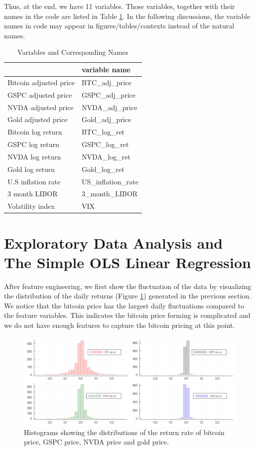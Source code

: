 \documentclass[9pt,twocolumn,twoside]{ilcss}
\begin{document}
Thus, at the end, we have 11 variables. Those variables, together with their names in the code are listed in Table \ref{var_names}. In the following discussions, the variable names in code may appear in figures/tables/contexts instead of the natural names.

\begin{table}[h]
\centering
\caption{Variables and Corresponding Names}
\label{var_names}
\begin{tabular}{@{\extracolsep{10pt}}ll} 
\hline
\hline
                       & variable name        \\ 
\hline
Bitcoin adjusted price & BTC\_adj\_price      \\
GSPC adjusted price    & GSPC\_adj\_price     \\
NVDA adjusted price    & NVDA\_adj\_price     \\
Gold adjusted price    & Gold\_adj\_price     \\
Bitcoin log return     & BTC\_log\_ret        \\
GSPC log return        & GSPC\_log\_ret       \\
NVDA log return        & NVDA\_log\_ret       \\
Gold log return        & Gold\_log\_ret       \\
U.S inflation rate     & US\_inflation\_rate  \\
3 month LIBOR          & 3\_month\_LIBOR      \\
Volatility index       & VIX                  \\
\hline
\end{tabular}
\end{table}

\section{Exploratory Data Analysis and The Simple OLS Linear Regression}
After feature engineering, we first show the fluctuation of the data by visualizing the distribution of the daily returns (Figure \ref{hist_distribution}) generated in the previous section. We notice that the bitcoin price has the largest daily fluctuations compared to the feature variables. This indicates the bitcoin price forming is complicated and we do not have enough features to capture the bitcoin pricing at this point.

\begin{figure}[tbhp]
\centering
\includegraphics[width=.85\linewidth]{return_hists.png}
\caption{Histograms showing the distributions of the return rate of bitcoin price, GSPC price, NVDA price and gold price.}
\label{hist_distribution}
\end{figure}
\end{document}
